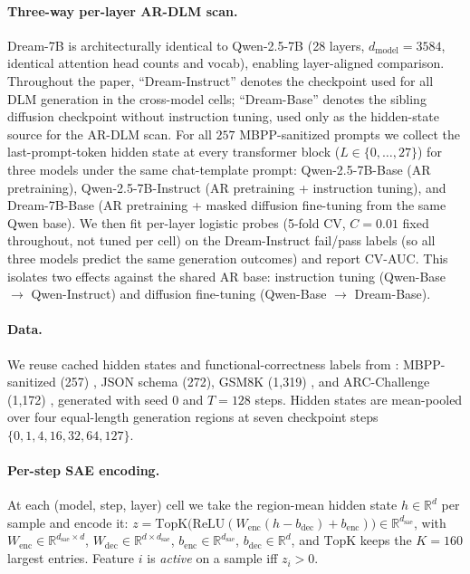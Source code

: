 \documentclass[11pt]{article}
\begin{document}
\paragraph{Three-way per-layer AR-DLM scan.}
\label{sec:method_ardlm}
Dream-7B is architecturally identical to Qwen-2.5-7B (28 layers, $d_{\mathrm{model}}{=}3584$, identical attention head counts and vocab), enabling layer-aligned comparison.
Throughout the paper, ``Dream-Instruct'' denotes the checkpoint used for all DLM generation in the cross-model cells; ``Dream-Base'' denotes the sibling diffusion checkpoint without instruction tuning, used only as the hidden-state source for the AR-DLM scan.
For all $257$ MBPP-sanitized prompts we collect the last-prompt-token hidden state at every transformer block ($L\!\in\!\{0,\ldots,27\}$) for three models under the same chat-template prompt: Qwen-2.5-7B-Base (AR pretraining), Qwen-2.5-7B-Instruct (AR pretraining + instruction tuning), and Dream-7B-Base (AR pretraining + masked diffusion fine-tuning from the same Qwen base).
We then fit per-layer logistic probes (5-fold CV, $C{=}0.01$ fixed throughout, not tuned per cell) on the Dream-Instruct fail/pass labels (so all three models predict the same generation outcomes) and report CV-AUC.
This isolates two effects against the shared AR base: instruction tuning (Qwen-Base $\to$ Qwen-Instruct) and diffusion fine-tuning (Qwen-Base $\to$ Dream-Base).

\paragraph{Data.}
We reuse cached hidden states and functional-correctness labels from \citet{chiu2026probe}: MBPP-sanitized (257) \citep{austin2021program}, JSON schema (272), GSM8K (1{,}319) \citep{cobbe2021gsm8k}, and ARC-Challenge (1{,}172) \citep{clark2018arc}, generated with seed $0$ and $T{=}128$ steps.
Hidden states are mean-pooled over four equal-length generation regions at seven checkpoint steps $\{0,1,4,16,32,64,127\}$.

\paragraph{Per-step SAE encoding.}
At each (model, step, layer) cell we take the region-mean hidden state $h \in \mathbb{R}^{d}$ per sample and encode it:
$z = \mathrm{TopK}\!\bigl(\mathrm{ReLU}\!\left(W_{\mathrm{enc}}(h{-}b_{\mathrm{dec}}) + b_{\mathrm{enc}}\right)\!\bigr) \in \mathbb{R}^{d_{\mathrm{sae}}}$,
with $W_{\mathrm{enc}}\!\in\!\mathbb{R}^{d_{\mathrm{sae}}\times d}$, $W_{\mathrm{dec}}\!\in\!\mathbb{R}^{d\times d_{\mathrm{sae}}}$, $b_{\mathrm{enc}}\!\in\!\mathbb{R}^{d_{\mathrm{sae}}}$, $b_{\mathrm{dec}}\!\in\!\mathbb{R}^{d}$,
and $\mathrm{TopK}$ keeps the $K{=}160$ largest entries.
Feature $i$ is \emph{active} on a sample iff $z_i\!>\!0$.
\end{document}
